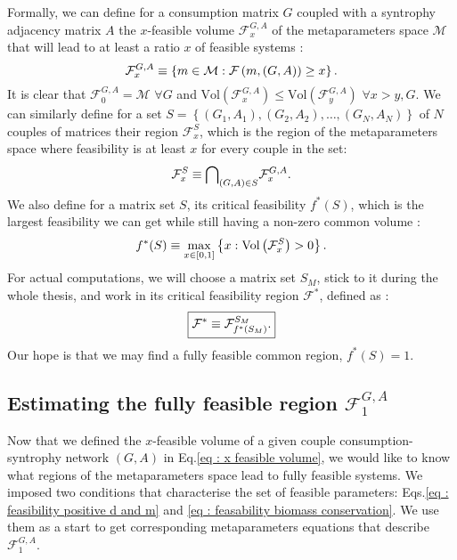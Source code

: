 \documentclass[12pt, titlepage]{report}
\begin{document}
Formally, we can define for a consumption matrix $G$ coupled with a syntrophy adjacency matrix $A$ the $x$-feasible volume $\mathcal{F}^{G,A}_x$ of the metaparameters space $\mathcal{M}$ that will lead to at least a ratio $x$ of feasible systems \ie :
\begin{equation}
\mathcal{F}^{G,A}_x \equiv \left\{m \in \mathcal{M} : \mathcal{F}\left(m, (G,A)\right)\geq x \right\}. \label{eq : x feasible volume}
\end{equation}
It is clear that $\mathcal{F}^{G,A}_0 = \mathcal{M}$ $\forall G$ and $\text{Vol}\left(\mathcal{F}^{G,A}_{x}\right) \leq \text{Vol}\left(\mathcal{F}^{G,A}_{y}\right)$ $\forall x > y, G$. We can similarly define for a set $S = \left\{ (G_1,A_1) , (G_2, A_2), \dots, (G_N, A_N)\right\}$ of $N$ couples of matrices their  region $\mathcal{F}^S_x$, which is the region of the metaparameters space where feasibility is at least $x$ for every couple in the set:
\begin{equation}
\mathcal{F}^S_x \equiv {\bigcap}_{(G,A) \in S} \mathcal{F}^{G,A}_x.
\end{equation}
We also define for a matrix set $S$, its critical feasibility $f^*(S)$, which is the largest feasibility we can get while still having a non-zero common volume :
\begin{equation}
f^*(S) \equiv \max_{x \in \left[0,1\right]}\left\{ x : \text{Vol}\left(\mathcal{F}^S_x\right) > 0 \right\}. \label{eq : feasibility methods critical common feasibility}
\end{equation}
For actual computations, we will choose a matrix set $S_M$, stick to it during the whole thesis, and work in its critical feasibility region $\mathcal{F}^*$, defined as :
\begin{equation}\boxed{
\mathcal{F}^* \equiv \mathcal{F}^{S_M}_{f^*(S_M)}. \label{eq : feasibility methods critical common feasibility region}
}
\end{equation}
Our hope is that we may find a fully feasible common region, \ie $f^*(S)=1$. 

\subsection{Estimating the fully feasible region $\mathcal{F}^{G,A}_1$}
Now that we defined the $x$-feasible volume of a given couple consumption-syntrophy network $(G,A)$ in Eq.\eqref{eq : x feasible volume}, we would like to know what regions of the metaparameters space lead to fully feasible systems. We imposed two conditions that characterise the set of feasible parameters: Eqs.\eqref{eq : feasibility positive d and m} and \eqref{eq : feasability biomass conservation}. We use them as a start to get corresponding metaparameters equations that describe $\mathcal{F}^{G,A}_1$.
\end{document}
